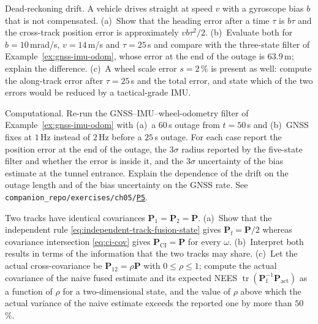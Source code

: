 \documentclass[graybox,envcountchap]{style/SNmono}
\DeclareMathOperator{\tr}{tr}
\newcommand{\repopath}[1]{\texttt{#1}}
\providecommand{\DIFadd}[1]{{\protect\color{blue} #1}} %
\providecommand{\DIFdel}[1]{{\protect\color{red} #1}} %
\DeclareRobustCommand{\RtwoDel}[1]{{\color{red}%
  \renewcommand{\DIFadd}[1]{##1}\renewcommand{\DIFdel}[1]{##1}%
  #1}}
\DeclareRobustCommand{\RtwoAdd}[1]{{\color{blue}#1}}
\DeclareRobustCommand{\codeentry}[1]{\hyperref[code:#1]{\texttt{#1}}}
\begin{document}
\begin{prob}\label{prob:ch05:3}
Dead-reckoning drift. A vehicle drives straight at speed $v$ with a gyroscope bias $b$ that is not compensated. (a)~Show that the heading error after a time $\tau$ is $b\tau$ and the cross-track position error is approximately $vb\tau^{2}/2$. (b)~Evaluate both for $b=10$\,mrad/s, $v=14$\,m/s and $\tau=25$\,s and compare with the three-state filter of Example~\ref{ex:gnss-imu-odom}, whose error at the end of the outage is $63.9$\,m; explain the difference. (c)~A wheel scale error $s=2$\,\% is present as well: compute the along-track error after $\tau=25$\,s and the total error, and state which of the two errors would be reduced by a tactical-grade IMU.
\end{prob}

\begin{prob}\label{prob:ch05:4}
Computational. Re-run the GNSS--IMU--wheel-odometry filter of Example~\ref{ex:gnss-imu-odom} with (a)~a $60$\,s outage from $t=50$\,s and (b)~GNSS fixes at $1$\,Hz instead of $2$\,Hz before a $25$\,s outage. For each case report the position error at the end of the outage, the $3\sigma$ radius reported by the five-state filter and whether the error is inside it, and the $3\sigma$ uncertainty of the bias estimate at the tunnel entrance. Explain the dependence of the drift on the outage length and of the bias uncertainty on the GNSS rate. See \RtwoDel{\repopath{companion\_\allowbreak repo/\allowbreak exercises/\allowbreak ch05/\allowbreak }}\RtwoAdd{\codeentry{P5}}.
\end{prob}

\begin{prob}\label{prob:ch05:5}
Two tracks have identical covariances $\mathbf{P}_{1}=\mathbf{P}_{2}=\mathbf{P}$. (a)~Show that the independent rule \eqref{eq:independent-track-fusion-state} gives $\mathbf{P}_{\mathrm{f}}=\mathbf{P}/2$ whereas covariance intersection \eqref{eq:ci-cov} gives $\mathbf{P}_{\mathrm{CI}}=\mathbf{P}$ for every $\omega$. (b)~Interpret both results in terms of the information that the two tracks may share. (c)~Let the actual cross-covariance be $\mathbf{P}_{12}=\rho\mathbf{P}$ with $0\le\rho\le1$; compute the actual covariance of the naive fused estimate and its expected NEES $\tr(\mathbf{P}_{\mathrm{f}}^{-1}\mathbf{P}_{\mathrm{act}})$ as a function of $\rho$ for a two-dimensional state, and the value of $\rho$ above which the actual variance of the naive estimate exceeds the reported one by more than $50$\,\%.
\end{prob}
\end{document}
